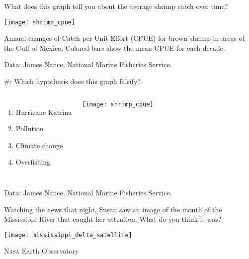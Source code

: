 \documentclass[t]{beamer}
\newcommand*{\cq}[1]{%
	\#{\lining#1}:%
}
\begin{document}
%
%		
%		
%		
%		
%
\begin{frame}{What does this graph tell you about the average shrimp catch over time?}

	\vspace*{-\baselineskip}
	
	{\centering\texttt{[image: shrimp\_cpue]}\par
	}

	{\small Annual changes of Catch per Unit Effort (CPUE) for brown shrimp in areas of the Gulf of Mexico. Colored bars show the mean CPUE for each decade.}
	
	\vfilll
	
	\hfill \tiny Data: James Nance, National Marine Fisheries Service.
\end{frame}
%
\begin{frame}{\cq{2} Which hypothesis does this graph falsify?}

	\begin{columns}[t]

			\begin{enumerate}
				\item Hurricane Katrina
				\item Pollution
				\item Climate change
				\item Overfishing
			\end{enumerate}
			

			\texttt{[image: shrimp\_cpue]}

	\end{columns}

	\vfilll
	
	\hfill \tiny Data: James Nance, National Marine Fisheries Service.
\end{frame}
%
\begin{frame}
	Watching the news that night, Susan saw 
	an image of the mouth of the 
	Mississippi River that caught her attention. What do you think it was?

	\texttt{[image: mississippi\_delta\_satellite]}

	\vfilll

	\hfill \tiny \textsc{Nasa} Earth Observatory
\end{frame}
\end{document}
